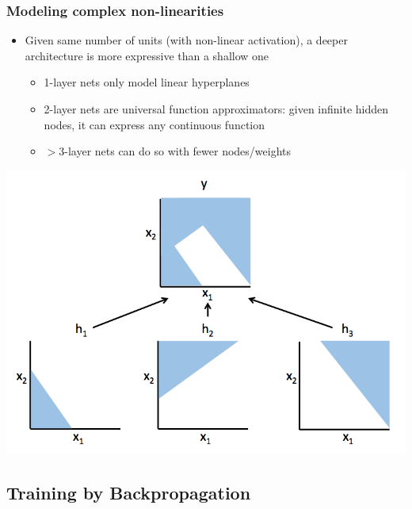 \documentclass{beamer}
\newcommand{\bi}{\begin{itemize}}
\newcommand{\ei}{\end{itemize}}
\begin{document}
\begin{frame}
\frametitle{Modeling complex non-linearities}
\bi
\item Given same number of units (with non-linear activation), a deeper architecture is more expressive than a shallow one
\cite{bishop95book}
\bi
	\item 1-layer nets only model linear hyperplanes
	\item 2-layer nets are universal function approximators: given infinite hidden nodes, it can express any continuous function
	\item $>$3-layer nets can do so with fewer nodes/weights
\ei
\ei
\centerline{\includegraphics[scale=0.27]{figs/twolayer_nonlinearity}}
\end{frame}


\subsection[Backpropagation]{Training by Backpropagation}
\end{document}
